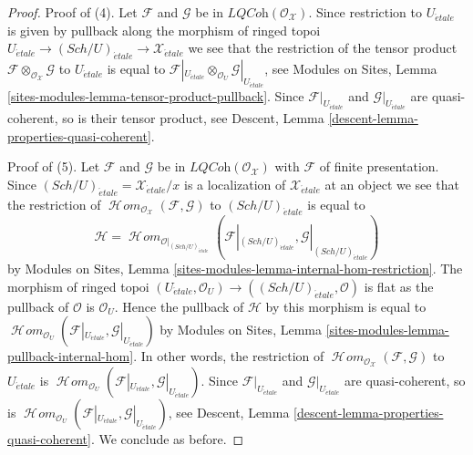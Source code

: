 \documentclass[10pt,a4paper]{amsart}
\theoremstyle{plain}
\theoremstyle{definition}
\theoremstyle{remark}
\numberwithin{equation}{subsection}
\def\SheafHom{\mathop{\mathcal{H}\!\mathit{om}}\nolimits}
\def\Sch{\mathit{Sch}}
\def\etale{{\acute{e}tale}}
\begin{document}
\begin{proof}
\medskip\noindent
Proof of (4). Let $\mathcal{F}$ and $\mathcal{G}$ be in
$\textit{LQCoh}(\mathcal{O}_\mathcal{X})$. Since restriction to $U_\etale$
is given by pullback along the morphism of ringed topoi
$U_\etale \to (\Sch/U)_\etale \to \mathcal{X}_\etale$
we see that the restriction of the tensor product
$\mathcal{F} \otimes_{\mathcal{O}_\mathcal{X}} \mathcal{G}$
to $U_\etale$ is equal to
$\mathcal{F}|_{U_\etale} \otimes_{\mathcal{O}_U} \mathcal{G}|_{U_\etale}$,
see Modules on Sites, Lemma \ref{sites-modules-lemma-tensor-product-pullback}.
Since $\mathcal{F}|_{U_\etale}$ and $\mathcal{G}|_{U_\etale}$
are quasi-coherent, so is their tensor product, see
Descent, Lemma \ref{descent-lemma-properties-quasi-coherent}.

\medskip\noindent
Proof of (5). Let $\mathcal{F}$ and $\mathcal{G}$ be in
$\textit{LQCoh}(\mathcal{O}_\mathcal{X})$ with $\mathcal{F}$
of finite presentation. Since
$(\Sch/U)_\etale = \mathcal{X}_\etale/x$
is a localization of $\mathcal{X}_\etale$ at an object
we see that the restriction of
$\SheafHom_{\mathcal{O}_\mathcal{X}}(\mathcal{F}, \mathcal{G})$
to $(\Sch/U)_\etale$ is equal to
$$
\mathcal{H} =
\SheafHom_{\mathcal{O}|_{(\Sch/U)_\etale}}(
\mathcal{F}|_{(\Sch/U)_\etale}, \mathcal{G}|_{(\Sch/U)_\etale})
$$
by Modules on Sites, Lemma \ref{sites-modules-lemma-internal-hom-restriction}.
The morphism of ringed topoi
$(U_\etale, \mathcal{O}_U) \to ((\Sch/U)_\etale, \mathcal{O})$
is flat as the pullback of $\mathcal{O}$ is $\mathcal{O}_U$.
Hence the pullback of $\mathcal{H}$ by this morphism is equal to
$\SheafHom_{\mathcal{O}_U}(\mathcal{F}|_{U_\etale}, \mathcal{G}|_{U_\etale})$
by Modules on Sites, Lemma \ref{sites-modules-lemma-pullback-internal-hom}.
In other words, the restriction of
$\SheafHom_{\mathcal{O}_\mathcal{X}}(\mathcal{F}, \mathcal{G})$
to $U_\etale$ is
$\SheafHom_{\mathcal{O}_U}(\mathcal{F}|_{U_\etale}, \mathcal{G}|_{U_\etale})$.
Since $\mathcal{F}|_{U_\etale}$ and $\mathcal{G}|_{U_\etale}$
are quasi-coherent, so is
$\SheafHom_{\mathcal{O}_U}(\mathcal{F}|_{U_\etale}, \mathcal{G}|_{U_\etale})$,
see Descent, Lemma \ref{descent-lemma-properties-quasi-coherent}.
We conclude as before.
\end{proof}
\end{document}
